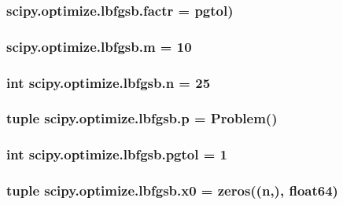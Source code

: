 \subsubsection[{factr}]{\setlength{\rightskip}{0pt plus 5cm}scipy.\+optimize.\+lbfgsb.\+factr = {\bf pgtol})}\label{namespacescipy_1_1optimize_1_1lbfgsb_abc96c3036bc9c1364492a91ec4ddd52b}
\hypertarget{namespacescipy_1_1optimize_1_1lbfgsb_aa8d728249f11931cff01c945bbaf668e}{}
\subsubsection[{m}]{\setlength{\rightskip}{0pt plus 5cm}scipy.\+optimize.\+lbfgsb.\+m = 10}\label{namespacescipy_1_1optimize_1_1lbfgsb_aa8d728249f11931cff01c945bbaf668e}
\hypertarget{namespacescipy_1_1optimize_1_1lbfgsb_a629de846ab6929bd165a5f48d2f8f82d}{}
\subsubsection[{n}]{\setlength{\rightskip}{0pt plus 5cm}int scipy.\+optimize.\+lbfgsb.\+n = 25}\label{namespacescipy_1_1optimize_1_1lbfgsb_a629de846ab6929bd165a5f48d2f8f82d}
\hypertarget{namespacescipy_1_1optimize_1_1lbfgsb_a011248dd8389fc02db79e97e9341b120}{}
\subsubsection[{p}]{\setlength{\rightskip}{0pt plus 5cm}tuple scipy.\+optimize.\+lbfgsb.\+p = {\bf Problem}()}\label{namespacescipy_1_1optimize_1_1lbfgsb_a011248dd8389fc02db79e97e9341b120}
\hypertarget{namespacescipy_1_1optimize_1_1lbfgsb_aa4981973ec364e19f1b35f31bff58693}{}
\subsubsection[{pgtol}]{\setlength{\rightskip}{0pt plus 5cm}int scipy.\+optimize.\+lbfgsb.\+pgtol = 1}\label{namespacescipy_1_1optimize_1_1lbfgsb_aa4981973ec364e19f1b35f31bff58693}
\hypertarget{namespacescipy_1_1optimize_1_1lbfgsb_a563527e71404a7c467540bc91ce9bf24}{}
\subsubsection[{x0}]{\setlength{\rightskip}{0pt plus 5cm}tuple scipy.\+optimize.\+lbfgsb.\+x0 = zeros(({\bf n},), float64)}\label{namespacescipy_1_1optimize_1_1lbfgsb_a563527e71404a7c467540bc91ce9bf24}
